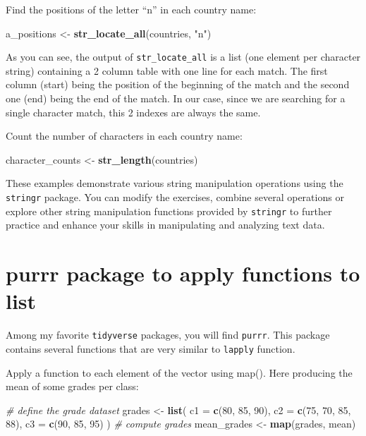 \documentclass[
]{book}
\newenvironment{Shaded}{\begin{snugshade}}{\end{snugshade}}
\newcommand{\AttributeTok}[1]{\textcolor[rgb]{0.13,0.29,0.53}{#1}}
\newcommand{\CommentTok}[1]{\textcolor[rgb]{0.56,0.35,0.01}{\textit{#1}}}
\newcommand{\DecValTok}[1]{\textcolor[rgb]{0.00,0.00,0.81}{#1}}
\newcommand{\FunctionTok}[1]{\textcolor[rgb]{0.13,0.29,0.53}{\textbf{#1}}}
\newcommand{\NormalTok}[1]{#1}
\newcommand{\OtherTok}[1]{\textcolor[rgb]{0.56,0.35,0.01}{#1}}
\newcommand{\StringTok}[1]{\textcolor[rgb]{0.31,0.60,0.02}{#1}}
\begin{document}
Find the positions of the letter ``n'' in each country name:

\begin{Shaded}
\begin{Highlighting}[]
\NormalTok{a\_positions }\OtherTok{\textless{}{-}} \FunctionTok{str\_locate\_all}\NormalTok{(countries, }\StringTok{"n"}\NormalTok{)}
\end{Highlighting}
\end{Shaded}

As you can see, the output of \texttt{str\_locate\_all} is a list (one element per character string) containing a 2 column table with one line for each match. The first column (start) being the position of the beginning of the match and the second one (end) being the end of the match. In our case, since we are searching for a single character match, this 2 indexes are always the same.

Count the number of characters in each country name:

\begin{Shaded}
\begin{Highlighting}[]
\NormalTok{character\_counts }\OtherTok{\textless{}{-}} \FunctionTok{str\_length}\NormalTok{(countries)}
\end{Highlighting}
\end{Shaded}

These examples demonstrate various string manipulation operations using the \texttt{stringr} package. You can modify the exercises, combine several operations or explore other string manipulation functions provided by \texttt{stringr} to further practice and enhance your skills in manipulating and analyzing text data.

\section{purrr package to apply functions to list}\label{purrr-package-to-apply-functions-to-list}

Among my favorite \texttt{tidyverse} packages, you will find \texttt{purrr}. This package contains
several functions that are very similar to \texttt{lapply} function.

Apply a function to each element of the vector using map(). Here producing the mean of some grades per class:

\begin{Shaded}
\begin{Highlighting}[]
\CommentTok{\# define the grade dataset}
\NormalTok{grades }\OtherTok{\textless{}{-}}
  \FunctionTok{list}\NormalTok{(}
    \AttributeTok{c1 =} \FunctionTok{c}\NormalTok{(}\DecValTok{80}\NormalTok{, }\DecValTok{85}\NormalTok{, }\DecValTok{90}\NormalTok{),}
    \AttributeTok{c2 =} \FunctionTok{c}\NormalTok{(}\DecValTok{75}\NormalTok{, }\DecValTok{70}\NormalTok{, }\DecValTok{85}\NormalTok{, }\DecValTok{88}\NormalTok{),}
    \AttributeTok{c3 =} \FunctionTok{c}\NormalTok{(}\DecValTok{90}\NormalTok{, }\DecValTok{85}\NormalTok{, }\DecValTok{95}\NormalTok{)}
\NormalTok{  )}
\CommentTok{\# compute grades}
\NormalTok{mean\_grades }\OtherTok{\textless{}{-}} \FunctionTok{map}\NormalTok{(grades, mean)}
\end{Highlighting}
\end{Shaded}
\end{document}
